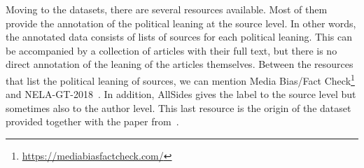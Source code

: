 Moving to the datasets, there are several resources available.
Most of them provide the annotation of the political leaning at the source level. In other words, the annotated data consists of lists of sources for each political leaning. This can be accompanied by a collection of articles with their full text, but there is no direct annotation of the leaning of the articles themselves.
Between the resources that list the political leaning of sources, we can mention Media Bias/Fact Check\footnote{\url{https://mediabiasfactcheck.com/}} and NELA-GT-2018~\citep{DVN/ULHLCB_2019}.
In addition, AllSides gives the label to the source level but sometimes also to the author level. This last resource is the origin of the dataset provided together with the paper from~\citet{baly2020we}.





